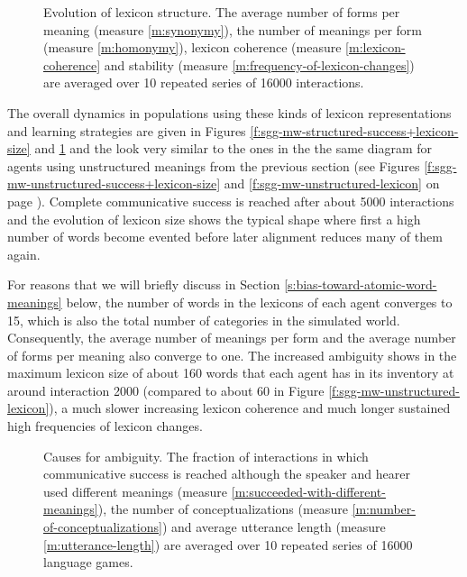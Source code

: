 \begin{figure}[t]
  \caption{Evolution of lexicon structure. The average number of forms
    per meaning (measure \ref{m:synonymy}), the number of meanings per
    form (measure \ref{m:homonymy}), lexicon coherence (measure
    \ref{m:lexicon-coherence} and stability (measure
    \ref{m:frequency-of-lexicon-changes}) are averaged over 10
    repeated series of 16000 interactions.}
  \label{f:sgg-mw-structured-lexicon}
\end{figure}


\stopfiguregroup

The overall dynamics in populations using these kinds of lexicon
representations and learning strategies are given in Figures
\ref{f:sgg-mw-structured-success+lexicon-size} and
\ref{f:sgg-mw-structured-lexicon} and the look very similar to the
ones in the the same diagram for agents using unstructured meanings
from the previous section (see Figures
\ref{f:sgg-mw-unstructured-success+lexicon-size} and
\ref{f:sgg-mw-unstructured-lexicon} on page
\pageref{f:sgg-mw-unstructured-success+lexicon-size}). Complete
communicative success is reached after about 5000 interactions and the
evolution of lexicon size shows the typical shape where first a high
number of words become evented before later alignment reduces many of
them again. 

For reasons that we will briefly discuss in Section
\ref{s:bias-toward-atomic-word-meanings} below, the number of words in
the lexicons of each agent converges to 15, which is also the total
number of categories in the simulated world. Consequently, the average
number of meanings per form and the average number of forms per
meaning also converge to one. The increased ambiguity shows in the
maximum lexicon size of about 160 words that each agent has in its
inventory at around interaction 2000 (compared to about 60 in Figure
\ref{f:sgg-mw-unstructured-lexicon}), a much slower increasing
lexicon coherence and much longer sustained high frequencies of
lexicon changes.


\begin{figure}[t]
  \caption{Causes for ambiguity. The fraction of interactions in which
    communicative success is reached although the speaker and hearer
    used different meanings (measure
    \ref{m:succeeded-with-different-meanings}), the number of
    conceptualizations (measure \ref{m:number-of-conceptualizations})
    and average utterance length (measure \ref{m:utterance-length})
    are averaged over 10 repeated series of 16000 language games.}
  \label{f:sgg-mw-structured-misunderstandings+conceptualizations+utterance-length}
\end{figure}

